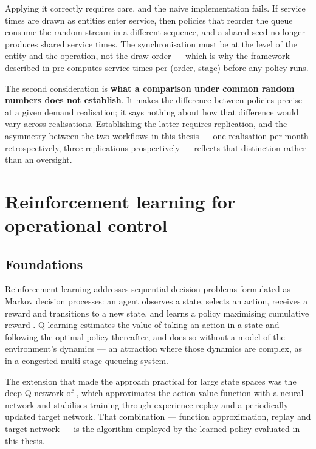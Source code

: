 Applying it correctly requires care, and the naive implementation fails. If service times are
drawn as entities enter service, then policies that reorder the queue consume the random stream
in a different sequence, and a shared seed no longer produces shared service times. The
synchronisation must be at the level of the entity and the operation, not the draw order ---
which is why the framework described in  pre-computes service times per (order,
stage) before any policy runs.

The second consideration is \textbf{what a comparison under common random numbers does not
establish}. It makes the difference between policies precise at a given demand realisation; it
says nothing about how that difference would vary across realisations. Establishing the latter
requires replication, and the asymmetry between the two workflows in this thesis --- one
realisation per month retrospectively, three replications prospectively --- reflects that
distinction rather than an oversight.

\section{Reinforcement learning for operational control}
\label{sec:lit-rl}

\subsection{Foundations}

Reinforcement learning addresses sequential decision problems formulated as Markov decision
processes: an agent observes a state, selects an action, receives a reward and transitions to a
new state, and learns a policy maximising cumulative reward \citep{suttonbarto2018}. Q-learning
estimates the value of taking an action in a state and following the optimal policy thereafter,
and does so without a model of the environment's dynamics --- an attraction where those dynamics
are complex, as in a congested multi-stage queueing system.

The extension that made the approach practical for large state spaces was the deep Q-network of
\citet{mnih2015}, which approximates the action-value function with a neural network and
stabilises training through experience replay and a periodically updated target network. That
combination --- function approximation, replay and target network --- is the algorithm employed
by the learned policy evaluated in this thesis.

